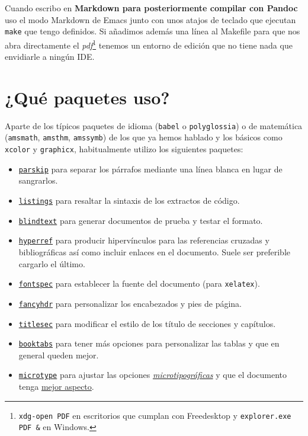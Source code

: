 Cuando escribo en \textbf{Markdown para posteriormente compilar con
Pandoc} uso el modo Markdown de Emacs junto con unos atajos de teclado
que ejecutan \lstinline!make! que tengo definidos. Si añadimos además
una línea al Makefile para que nos abra directamente el
\emph{pdf}\footnote{\lstinline!xdg-open PDF! en escritorios que cumplan
  con Freedesktop y \lstinline!explorer.exe PDF &! en Windows.} tenemos
un entorno de edición que no tiene nada que envidiarle a ningún IDE.

\section{¿Qué paquetes uso?}

Aparte de los típicos paquetes de idioma (\lstinline!babel! o
\lstinline!polyglossia!) o de matemática (\lstinline!amsmath!,
\lstinline!amsthm!, \lstinline!amssymb!) de los que ya hemos hablado y
los básicos como \lstinline!xcolor! y \lstinline!graphicx!,
habitualmente utilizo los siguientes paquetes:

\begin{itemize}
\item
  \href{https://ctan.org/pkg/parskip}{\lstinline!parskip!} para separar
  los párrafos mediante una línea blanca en lugar de sangrarlos.
\item
  \href{https://www.ctan.org/pkg/listings}{\lstinline!listings!} para
  resaltar la sintaxis de los extractos de código.
\item
  \href{https://www.ctan.org/pkg/blindtext}{\lstinline!blindtext!} para
  generar documentos de prueba y testar el formato.
\item
  \href{https://ctan.org/pkg/hyperref}{\lstinline!hyperref!} para
  producir hipervínculos para las referencias cruzadas y bibliográficas
  así como incluir enlaces en el documento. Suele ser preferible
  cargarlo el último.
\item
  \href{https://ctan.org/pkg/fontspec}{\lstinline!fontspec!} para
  establecer la fuente del documento (para \lstinline!xelatex!).
\item
  \href{https://www.ctan.org/pkg/fancyhdr}{\lstinline!fancyhdr!} para
  personalizar los encabezados y pies de página.
\item
  \href{https://www.ctan.org/pkg/titlesec}{\lstinline!titlesec!} para
  modificar el estilo de los título de secciones y capítulos.
\item
  \href{https://ctan.org/tex-archive/macros/latex/contrib/booktabs/}{\lstinline!booktabs!}
  para tener más opciones para personalizar las tablas y que en general
  queden mejor.
\item
  \href{https://ctan.org/tex-archive/macros/latex/contrib/microtype/}{\lstinline!microtype!}
  para ajustar las opciones
  \href{https://en.wikipedia.org/wiki/Microtypography}{\emph{microtipográficas}}
  y que el documento tenga
  \href{http://www.khirevich.com/latex/microtype/Microtype_example_blurred_text_ani.gif}{mejor
  aspecto}.
\end{itemize}

